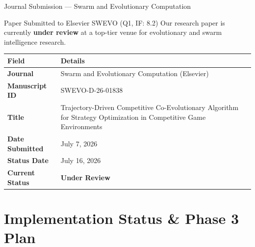 \documentclass[aspectratio=169, 11pt]{beamer}
\begin{document}
\begin{frame}{Journal Submission --- Swarm and Evolutionary Computation}
\begin{block}{Paper Submitted to Elsevier SWEVO (Q1, IF: 8.2)}
Our research paper is currently \textbf{under review} at a top-tier venue for evolutionary and swarm intelligence research.
\end{block}
\vspace{0.2cm}\centering
\renewcommand{\arraystretch}{1.3}
\begin{tabular}{p{4.2cm}p{7.8cm}}
    \toprule
    \textbf{Field} & \textbf{Details}\\
    \midrule
    \textbf{Journal}       & Swarm and Evolutionary Computation (Elsevier)\\
    \textbf{Manuscript ID}  & SWEVO-D-26-01838\\
    \textbf{Title}          & Trajectory-Driven Competitive Co-Evolutionary Algorithm for Strategy Optimization in Competitive Game Environments\\
    \textbf{Date Submitted} & July 7, 2026\\
    \textbf{Status Date}    & July 16, 2026\\
    \textbf{Current Status} & \textcolor{progAmber}{\textbf{Under Review}}\\
    \bottomrule
\end{tabular}
\end{frame}

\section{Implementation Status \& Phase 3 Plan}
\end{document}
